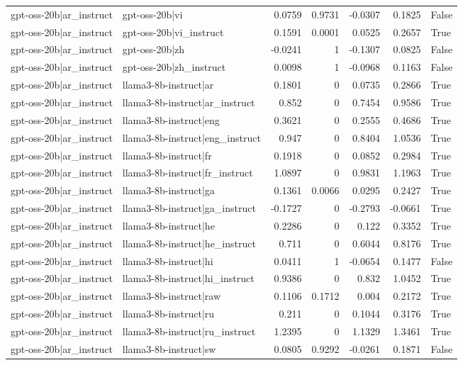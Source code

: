 \begin{table}
\begin{tabular}{l l r r r r l}
gpt-oss-20b|ar_instruct & gpt-oss-20b|vi & 0.0759 & 0.9731 & -0.0307 & 0.1825 & False \\
gpt-oss-20b|ar_instruct & gpt-oss-20b|vi_instruct & 0.1591 & 0.0001 & 0.0525 & 0.2657 & True \\
gpt-oss-20b|ar_instruct & gpt-oss-20b|zh & -0.0241 & 1 & -0.1307 & 0.0825 & False \\
gpt-oss-20b|ar_instruct & gpt-oss-20b|zh_instruct & 0.0098 & 1 & -0.0968 & 0.1163 & False \\
gpt-oss-20b|ar_instruct & llama3-8b-instruct|ar & 0.1801 & 0 & 0.0735 & 0.2866 & True \\
gpt-oss-20b|ar_instruct & llama3-8b-instruct|ar_instruct & 0.852 & 0 & 0.7454 & 0.9586 & True \\
gpt-oss-20b|ar_instruct & llama3-8b-instruct|eng & 0.3621 & 0 & 0.2555 & 0.4686 & True \\
gpt-oss-20b|ar_instruct & llama3-8b-instruct|eng_instruct & 0.947 & 0 & 0.8404 & 1.0536 & True \\
gpt-oss-20b|ar_instruct & llama3-8b-instruct|fr & 0.1918 & 0 & 0.0852 & 0.2984 & True \\
gpt-oss-20b|ar_instruct & llama3-8b-instruct|fr_instruct & 1.0897 & 0 & 0.9831 & 1.1963 & True \\
gpt-oss-20b|ar_instruct & llama3-8b-instruct|ga & 0.1361 & 0.0066 & 0.0295 & 0.2427 & True \\
gpt-oss-20b|ar_instruct & llama3-8b-instruct|ga_instruct & -0.1727 & 0 & -0.2793 & -0.0661 & True \\
gpt-oss-20b|ar_instruct & llama3-8b-instruct|he & 0.2286 & 0 & 0.122 & 0.3352 & True \\
gpt-oss-20b|ar_instruct & llama3-8b-instruct|he_instruct & 0.711 & 0 & 0.6044 & 0.8176 & True \\
gpt-oss-20b|ar_instruct & llama3-8b-instruct|hi & 0.0411 & 1 & -0.0654 & 0.1477 & False \\
gpt-oss-20b|ar_instruct & llama3-8b-instruct|hi_instruct & 0.9386 & 0 & 0.832 & 1.0452 & True \\
gpt-oss-20b|ar_instruct & llama3-8b-instruct|raw & 0.1106 & 0.1712 & 0.004 & 0.2172 & True \\
gpt-oss-20b|ar_instruct & llama3-8b-instruct|ru & 0.211 & 0 & 0.1044 & 0.3176 & True \\
gpt-oss-20b|ar_instruct & llama3-8b-instruct|ru_instruct & 1.2395 & 0 & 1.1329 & 1.3461 & True \\
gpt-oss-20b|ar_instruct & llama3-8b-instruct|sw & 0.0805 & 0.9292 & -0.0261 & 0.1871 & False \\

\end{tabular}
\end{table}
